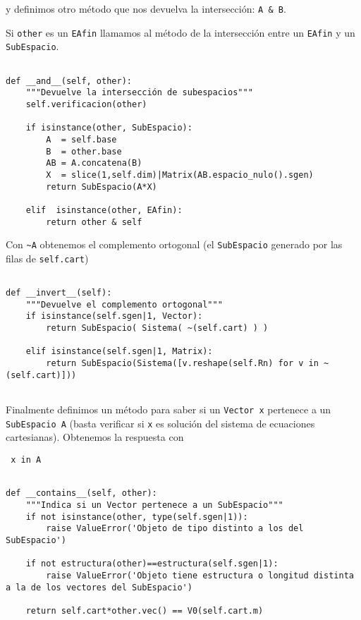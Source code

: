 \documentclass[11pt]{report}
\begin{document}
y definimos otro método que nos devuelva la intersección: \texttt{A \& B}. 

Si \texttt{other} es un \texttt{EAfin} llamamos al método de la intersección entre
un \texttt{EAfin} y un \texttt{SubEspacio}.

\begin{verbatim}

def __and__(self, other):
    """Devuelve la intersección de subespacios"""
    self.verificacion(other)
    
    if isinstance(other, SubEspacio):
        A  = self.base
        B  = other.base
        AB = A.concatena(B)
        X  = slice(1,self.dim)|Matrix(AB.espacio_nulo().sgen)
        return SubEspacio(A*X)
    
    elif  isinstance(other, EAfin):
        return other & self

\end{verbatim}

Con \texttt{\textasciitilde{}A} obtenemos el complemento ortogonal (el \texttt{SubEspacio} generado
por las filas de \texttt{self.cart})

\begin{verbatim}

def __invert__(self):
    """Devuelve el complemento ortogonal"""
    if isinstance(self.sgen|1, Vector):
        return SubEspacio( Sistema( ~(self.cart) ) )
    
    elif isinstance(self.sgen|1, Matrix):
        return SubEspacio(Sistema([v.reshape(self.Rn) for v in ~(self.cart)]))
    
\end{verbatim}

\noindent Finalmente definimos un método para saber si un \texttt{Vector x}
pertenece a un \texttt{SubEspacio A} (basta verificar si \texttt{x} es solución del
sistema de ecuaciones cartesianas). Obtenemos la respuesta con
\begin{center}
  \Verb/ x in A /
\end{center}

\begin{verbatim}

def __contains__(self, other):
    """Indica si un Vector pertenece a un SubEspacio"""    
    if not isinstance(other, type(self.sgen|1)):
        raise ValueError('Objeto de tipo distinto a los del SubEspacio')

    if not estructura(other)==estructura(self.sgen|1):
        raise ValueError('Objeto tiene estructura o longitud distinta a la de los vectores del SubEspacio')

    return self.cart*other.vec() == V0(self.cart.m)
        
\end{verbatim}
\end{document}

